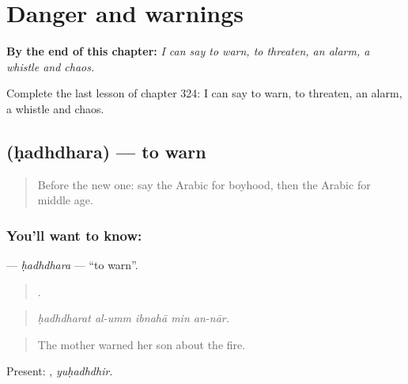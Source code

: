 
\chapter{Danger and warnings}
\label{ch:ar-danger-and-warnings}

\begin{chapteropening}
\textbf{By the end of this chapter:} \emph{I can say to warn, to threaten, an alarm, a whistle and chaos.}

Complete the last lesson of chapter 324: I can say to warn, to threaten, an alarm, a whistle and chaos.
\end{chapteropening}

\section[\texorpdfstring{\ar{حذر} (ḥadhdhara)}{حذر (ḥadhdhara)}]{ (ḥadhdhara) — to warn}

\label{lesson:AR-C324-hadhdhara}



\begin{quote}
Before the new one: say the Arabic for boyhood, then the Arabic for middle age.
\end{quote}

\subsection*{You'll want to know: }
\textbf{} — \emph{ḥadhdhara} — \textquotedblleft{}to warn\textquotedblright{}.

\begin{quote}
    .
\end{quote}

\begin{quote}
\emph{ḥadhdharat al-umm ibnahā min an-nār.}
\end{quote}

\begin{quote}
The mother warned her son about the fire.
\end{quote}

Present: , \emph{yuḥadhdhir}.

